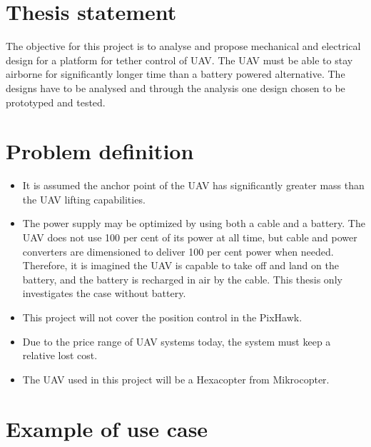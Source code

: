  


\section{Thesis statement} 

The objective for this project is to analyse and propose mechanical and electrical design for a platform for tether control of UAV. The UAV must be able to stay airborne for significantly longer time than a battery powered alternative. The designs have to be analysed and through the analysis one design chosen to be prototyped and tested.

\section{Problem definition}
\begin{itemize}
\item It is assumed the anchor point of the UAV has significantly greater mass than the UAV lifting capabilities.
\item The power supply may be optimized by using both a cable and a battery. The UAV does not use 100 per cent of its power at all time, but cable and power converters are dimensioned to deliver 100 per cent power when needed. Therefore, it is imagined the UAV is capable to take off and land on the battery, and the battery is recharged in air by the cable. This thesis only investigates the case without battery.
\item This project will not cover the position control in the PixHawk. 
\item Due to the price range of UAV systems today, the system must keep a relative lost cost.
\item The UAV used in this project will be a Hexacopter from Mikrocopter.
\end{itemize}


\section{Example of use case}

